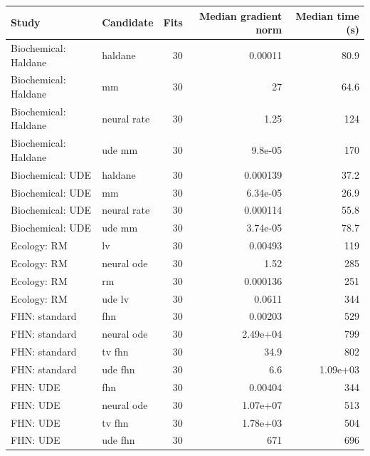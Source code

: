\begin{tabular}{llrrr}
\toprule
Study & Candidate & Fits & Median gradient norm & Median time (s)\\
\midrule
Biochemical: Haldane & haldane & 30 & 0.00011 & 80.9\\
Biochemical: Haldane & mm & 30 & 27 & 64.6\\
Biochemical: Haldane & neural rate & 30 & 1.25 & 124\\
Biochemical: Haldane & ude mm & 30 & 9.8e-05 & 170\\
Biochemical: UDE & haldane & 30 & 0.000139 & 37.2\\
Biochemical: UDE & mm & 30 & 6.34e-05 & 26.9\\
Biochemical: UDE & neural rate & 30 & 0.000114 & 55.8\\
Biochemical: UDE & ude mm & 30 & 3.74e-05 & 78.7\\
Ecology: RM & lv & 30 & 0.00493 & 119\\
Ecology: RM & neural ode & 30 & 1.52 & 285\\
Ecology: RM & rm & 30 & 0.000136 & 251\\
Ecology: RM & ude lv & 30 & 0.0611 & 344\\
FHN: standard & fhn & 30 & 0.00203 & 529\\
FHN: standard & neural ode & 30 & 2.49e+04 & 799\\
FHN: standard & tv fhn & 30 & 34.9 & 802\\
FHN: standard & ude fhn & 30 & 6.6 & 1.09e+03\\
FHN: UDE & fhn & 30 & 0.00404 & 344\\
FHN: UDE & neural ode & 30 & 1.07e+07 & 513\\
FHN: UDE & tv fhn & 30 & 1.78e+03 & 504\\
FHN: UDE & ude fhn & 30 & 671 & 696\\
\bottomrule
\end{tabular}
